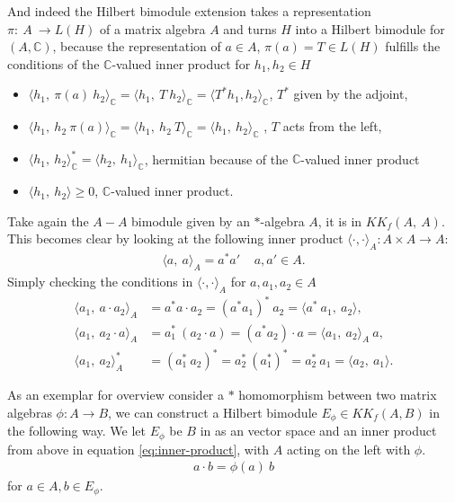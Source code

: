 And indeed the Hilbert bimodule extension takes a representation $\pi:\ A \
\rightarrow L(H)$ of a matrix algebra $A$ and turns $H$ into a Hilbert bimodule for
$(A, \mathbb{C})$, because the representation of $a \in A$, $\pi(a)=T \in L(H)$ fulfills
the conditions of the $\mathbb{C}$-valued inner product for $h_1, h_2 \in H$
\begin{itemize}
    \item $\langle h_1,\ \pi(a)\ h_2\rangle _\mathbb{C} = \langle h_1,\ T\ h_2\rangle _\mathbb{C} =
        \langle T^* h_1, h_2\rangle _\mathbb{C}$, $T^*$ given by the adjoint,
    \item $\langle h_1,\ h_2\ \pi(a)\rangle _\mathbb{C} = \langle h_1,\ h_2\
        T\rangle _\mathbb{C} = \langle h_1,\ h_2\rangle _\mathbb{C}$ , $T$ acts
        from the left,
    \item $\langle h_1,\ h_2\rangle _\mathbb{C}^* = \langle h_2,\ h_1\rangle _\mathbb{C}$, hermitian because of the
        $\mathbb{C}$-valued inner product
    \item $\langle h_1,\ h_2\rangle  \ge 0$, $\mathbb{C}$-valued inner product.
\end{itemize}

Take again the $A-A$ bimodule given by an $*$-algebra $A$, it is in
$KK_f(A,\ A)$. This becomes clear by looking at the following inner product
    $\langle \cdot,\cdot\rangle_A:A \times A \rightarrow A$:
    \begin{align}
        \langle a,\ a\rangle_A = a^*a' \;\;\;\; a,a'\in A. \label{eq:inner-product}
    \end{align}
    Simply checking the conditions in $\langle \cdot, \cdot\rangle _A$ for
    $a, a_1, a_2 \in A$
    \begin{align}
        \langle a_1,\ a\cdot a_2\rangle _A &= a^* a\cdot a_2 =
            (a^*a_1)^*\ a_2 = \langle  a^*\ a_1,\ a_2\rangle, \\
        \langle a_1,\ a_2 \cdot a\rangle _A &= a^*_1\ (a_2\cdot a) =
        (a^*a_2)\cdot a = \langle a_1,\ a_2\rangle _A\ a,\\
            \langle a_1,\ a_2\rangle _A^* &= (a_1^*\ a_2)^* = a_2^*\
            (a_1^*)^* = a_2^*\ a_1 = \langle a_2,\ a_1\rangle.
    \end{align}


As an exemplar for overview consider a $*$ homomorphism between two matrix
algebras $\phi:A\rightarrow B$, we can construct a Hilbert bimodule
$E_{\phi} \in KK_f(A, B)$ in the following way. We let $E_{\phi}$ be $B$ in
as an vector space and an inner product from above in equation
\eqref{eq:inner-product}, with $A$ acting on the left with $\phi$.
\begin{align}
    a\cdot b = \phi(a)\ b
\end{align}
for $a\in A, b\in E_{\phi}$.

